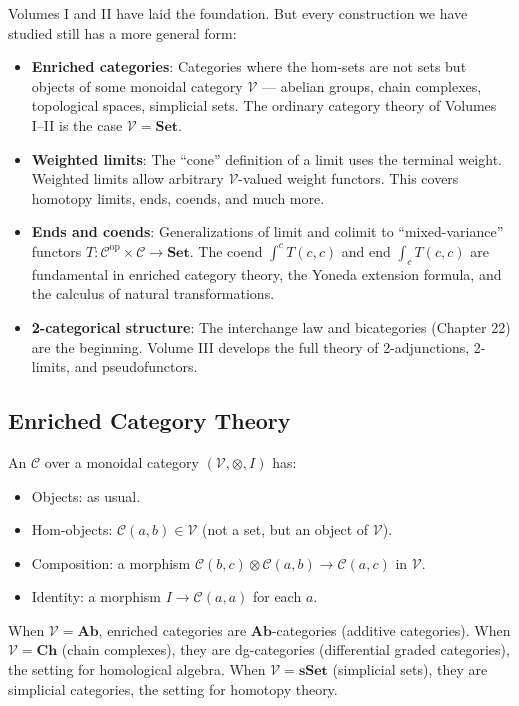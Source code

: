Volumes I and II have laid the foundation. But every construction we have
studied still has a more general form:
\begin{itemize}
  \item \textbf{Enriched categories}: Categories where the hom-sets are
        not sets but objects of some monoidal category $\mathcal{V}$ ---
        abelian groups, chain complexes, topological spaces, simplicial sets.
        The ordinary category theory of Volumes I--II is the case
        $\mathcal{V} = \mathbf{Set}$.
  \item \textbf{Weighted limits}: The ``cone'' definition of a limit uses
        the terminal weight. Weighted limits allow arbitrary
        $\mathcal{V}$-valued weight functors. This covers homotopy limits,
        ends, coends, and much more.
  \item \textbf{Ends and coends}: Generalizations of limit and colimit to
        ``mixed-variance'' functors $T : \mathcal{C}^{\mathrm{op}} \times
        \mathcal{C} \to \mathbf{Set}$. The coend $\int^c T(c,c)$ and
        end $\int_c T(c,c)$ are fundamental in enriched category theory,
        the Yoneda extension formula, and the calculus of natural
        transformations.
  \item \textbf{2-categorical structure}: The interchange law and
        bicategories (Chapter 22) are the beginning. Volume III develops
        the full theory of 2-adjunctions, 2-limits, and pseudofunctors.
\end{itemize}

\subsection{Enriched Category Theory}

An  $\mathcal{C}$ over a monoidal category
$(\mathcal{V}, \otimes, I)$ has:
\begin{itemize}
  \item Objects: as usual.
  \item Hom-objects: $\mathcal{C}(a,b) \in \mathcal{V}$ (not a set, but
        an object of $\mathcal{V}$).
  \item Composition: a morphism $\mathcal{C}(b,c) \otimes \mathcal{C}(a,b)
        \to \mathcal{C}(a,c)$ in $\mathcal{V}$.
  \item Identity: a morphism $I \to \mathcal{C}(a,a)$ for each $a$.
\end{itemize}
When $\mathcal{V} = \mathbf{Ab}$, enriched categories are $\mathbf{Ab}$-categories
(additive categories). When $\mathcal{V} = \mathbf{Ch}$ (chain complexes),
they are dg-categories (differential graded categories), the setting for
homological algebra. When $\mathcal{V} = \mathbf{sSet}$ (simplicial sets),
they are simplicial categories, the setting for homotopy theory.

